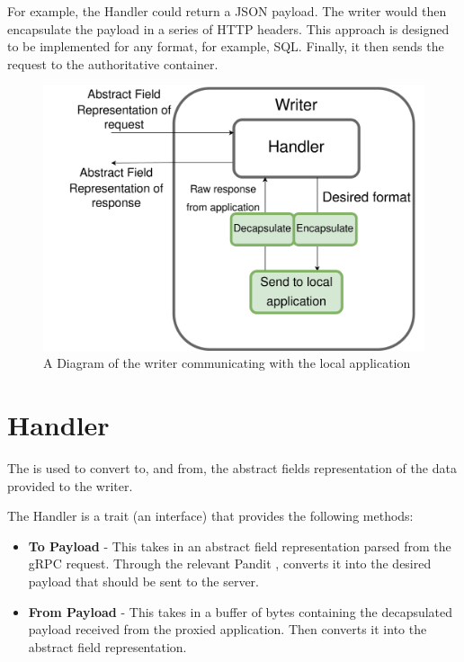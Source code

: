 \documentclass[a4paper,12pt]{report}
\begin{document}
For example, the Handler could return a JSON payload. The writer would then encapsulate the payload in a series of HTTP headers. This approach is designed to be implemented for any format, for example, SQL.
Finally, it then sends the request to the authoritative container.

\begin{figure}[hbt!]
    \centering
    \includegraphics[width=\linewidth]{writer.png}
    \caption{A Diagram of the writer communicating with the local application}
    \label{fig:admin}
\end{figure}

\newpage
\section{Handler}
\label{sec:handler}
The \textit{} is used to convert to, and from, the abstract fields representation of the data provided to the writer.

The Handler is a trait (an interface) that provides the following methods:

\begin{itemize}
    \item \textbf{To Payload} - This takes in an abstract field representation parsed from the gRPC request. Through the relevant Pandit , converts it into the desired payload that should be sent to the server.
    \item \textbf{From Payload} - This takes in a buffer of bytes containing the decapsulated payload received from the proxied application. Then converts it into the abstract field representation.
\end{itemize}
\end{document}
